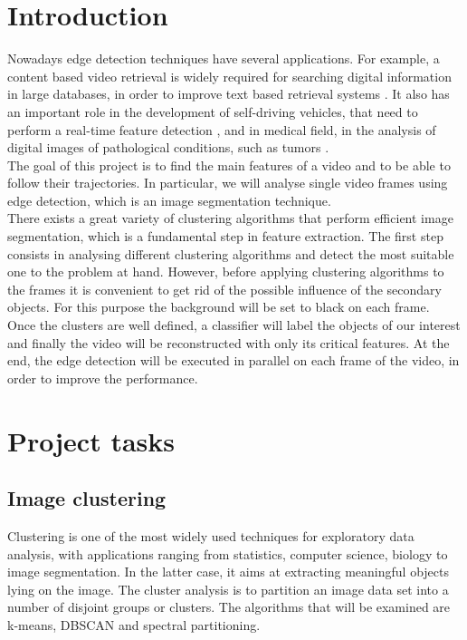 \documentclass[11pt]{article}
\begin{document}
\section*{Introduction}
Nowadays edge detection techniques have several applications. For example,  a content based video retrieval is widely required for searching digital information in large databases, in order to improve text based retrieval systems \cite{1}. It also has an important role in the development of self-driving vehicles, that need to perform a real-time feature detection \cite{2}, and in medical field, in the analysis of digital images of pathological conditions, such as tumors \cite{3}.    \\
The goal of this project is to find the main features of a video and to be able to follow their trajectories. In particular, we will analyse single video frames using edge detection, which is an image segmentation technique.  \\
There exists a great variety of clustering algorithms that perform efficient image segmentation, which is a fundamental step in feature extraction. 
The first step consists in analysing different clustering algorithms and detect the most suitable one to the problem at hand. However, before applying clustering algorithms to the frames it is convenient to get rid of the possible influence of the secondary objects. For this purpose the background will be set to black on each frame. \\
Once the clusters are well defined, a classifier will label the objects of our interest and finally the video will be reconstructed with only its critical features.  
At the end, the edge detection will be executed in parallel on each frame of the video, in order to improve the performance. 

\newpage
\section{Project tasks}
\subsection{Image clustering}
Clustering is one of the most widely used techniques for exploratory data analysis, with applications ranging from statistics, computer science, biology to image segmentation. In the latter case, it aims at extracting meaningful objects lying on the image. The cluster analysis is to partition an image data set into a number of disjoint groups or clusters. The  algorithms that will be examined are k-means, DBSCAN and spectral partitioning. 
\end{document}
